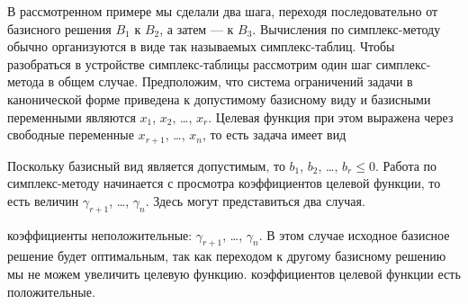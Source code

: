\documentclass{article}
\begin{document}
В рассмотренном примере мы сделали два шага, переходя последовательно от базисного решения $B_1$ к $B_2$, а затем — к $B_3$. Вычисления по симплекс-методу обычно организуются в виде так называемых симплекс-таблиц. Чтобы разобраться в устройстве симплекс-таблицы рассмотрим один шаг симплекс-метода в общем случае. Предположим, что система ограничений задачи в канонической форме приведена к допустимому базисному виду и базисными переменными являются $x_1$, $x_2$, \dots, $x_r$. Целевая функция при этом выражена через свободные переменные $x_{r+1}$, \dots, $x_n$, то есть задача имеет вид

Поскольку базисный вид является допустимым, то $b_1$, $b_2$, \dots, $b_r \leq 0$. Работа по симплекс-методу начинается с просмотра коэффициентов целевой функции, то есть величин $\gamma_{r+1}$, \dots, $\gamma_n$. Здесь могут представиться два случая.
		\begin{enumerate}
			\renewcommand{\theenumi}{(\arabic{enumi})}
			\renewcommand{\labelenumi}{\arabic{enumi})}
			 коэффициенты неположительные: $\gamma_{r+1}$, \dots, $\gamma_n$. В этом случае исходное базисное решение будет оптимальным, так как переходом к другому базисному решению мы не можем увеличить целевую функцию.
			 коэффициентов целевой функции есть положительные.
		\end{enumerate}
\end{document}
